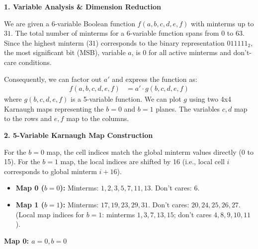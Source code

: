 \documentclass[12pt,a3paper]{article}
\begin{document}
\begin{enumerate}
\begin{tcolorbox}[enhanced,breakable,ansbox,colback=cC!4,colframe=cC,boxrule=0.8pt,arc=5pt,title={\textbf{Answer}},fonttitle=\bfseries\color{white},colbacktitle=cC]

\textbf{1. Variable Analysis \& Dimension Reduction}

We are given a 6-variable Boolean function $f(a,b,c,d,e,f)$ with minterms up to $31$. The total number of minterms for a 6-variable function spans from $0$ to $63$. Since the highest minterm ($31$) corresponds to the binary representation $011111_2$, the most significant bit (MSB), variable $a$, is $0$ for all active minterms and don't-care conditions. 

Consequently, we can factor out $a'$ and express the function as:
\begin{align*}
    f(a,b,c,d,e,f) &= a' \cdot g(b,c,d,e,f)
\end{align*}
where $g(b,c,d,e,f)$ is a 5-variable function. We can plot $g$ using two 4x4 Karnaugh maps representing the $b=0$ and $b=1$ planes. The variables $c, d$ map to the rows and $e, f$ map to the columns.

\vspace{1em}
\textbf{2. 5-Variable Karnaugh Map Construction}

For the $b=0$ map, the cell indices match the global minterm values directly (0 to 15). For the $b=1$ map, the local indices are shifted by 16 (i.e., local cell $i$ corresponds to global minterm $i+16$).
\begin{itemize}
    \item \textbf{Map 0 ($b=0$):} Minterms: $1, 2, 3, 5, 7, 11, 13$. Don't cares: $6$.
    \item \textbf{Map 1 ($b=1$):} Minterms: $17, 19, 23, 29, 31$. Don't cares: $20, 24, 25, 26, 27$. \\
    (Local map indices for $b=1$: minterms $1, 3, 7, 13, 15$; don't cares $4, 8, 9, 10, 11$).
\end{itemize}

\begin{center}
\begin{minipage}{0.45\textwidth}
\centering
\textbf{Map 0: $a=0, b=0$} \\
\vspace{0.5em}
\begin{karnaugh-map}[4][4][1][$ef$][$cd$]
    \autoterms[0]
    

\end{karnaugh-map}
\end{minipage}
\end{center}
\end{tcolorbox}
\end{enumerate}
\end{document}
